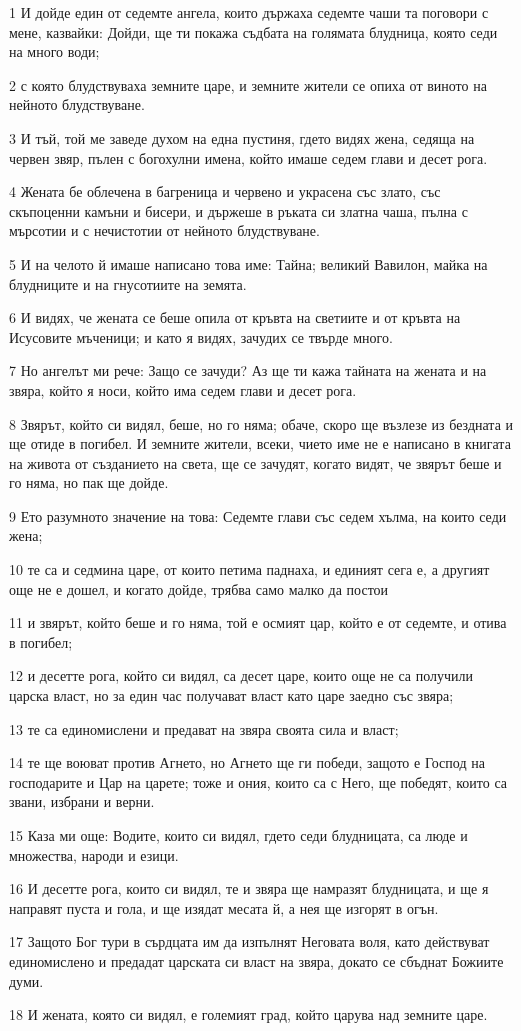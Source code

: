 \par 1 И дойде един от седемте ангела, които държаха седемте чаши та поговори с мене, казвайки: Дойди, ще ти покажа съдбата на голямата блудница, която седи на много води;
\par 2 с която блудствуваха земните царе, и земните жители се опиха от виното на нейното блудствуване.
\par 3 И тъй, той ме заведе духом на една пустиня, гдето видях жена, седяща на червен звяр, пълен с богохулни имена, който имаше седем глави и десет рога.
\par 4 Жената бе облечена в багреница и червено и украсена със злато, със скъпоценни камъни и бисери, и държеше в ръката си златна чаша, пълна с мърсотии и с нечистотии от нейното блудствуване.
\par 5 И на челото й имаше написано това име: Тайна; великий Вавилон, майка на блудниците и на гнусотиите на земята.
\par 6 И видях, че жената се беше опила от кръвта на светиите и от кръвта на Исусовите мъченици; и като я видях, зачудих се твърде много.
\par 7 Но ангелът ми рече: Защо се зачуди? Аз ще ти кажа тайната на жената и на звяра, който я носи, който има седем глави и десет рога.
\par 8 Звярът, който си видял, беше, но го няма; обаче, скоро ще възлезе из бездната и ще отиде в погибел. И земните жители, всеки, чието име не е написано в книгата на живота от създанието на света, ще се зачудят, когато видят, че звярът беше и го няма, но пак ще дойде.
\par 9 Ето разумното значение на това: Седемте глави със седем хълма, на които седи жена;
\par 10 те са и седмина царе, от които петима паднаха, и единият сега е, а другият още не е дошел, и когато дойде, трябва само малко да постои
\par 11 и звярът, който беше и го няма, той е осмият цар, който е от седемте, и отива в погибел;
\par 12 и десетте рога, който си видял, са десет царе, които още не са получили царска власт, но за един час получават власт като царе заедно със звяра;
\par 13 те са единомислени и предават на звяра своята сила и власт;
\par 14 те ще воюват против Агнето, но Агнето ще ги победи, защото е Господ на господарите и Цар на царете; тоже и ония, които са с Него, ще победят, които са звани, избрани и верни.
\par 15 Каза ми още: Водите, които си видял, гдето седи блудницата, са люде и множества, народи и езици.
\par 16 И десетте рога, които си видял, те и звяра ще намразят блудницата, и ще я направят пуста и гола, и ще изядат месата й, а нея ще изгорят в огън.
\par 17 Защото Бог тури в сърдцата им да изпълнят Неговата воля, като действуват единомислено и предадат царската си власт на звяра, докато се сбъднат Божиите думи.
\par 18 И жената, която си видял, е големият град, който царува над земните царе.

